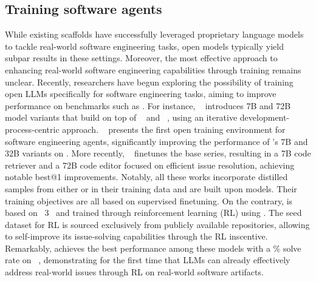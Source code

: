 \subsection{Training software agents}
While existing scaffolds have successfully leveraged proprietary language models to tackle real-world software engineering tasks, open models typically yield subpar results in these settings.
Moreover, the most effective approach to enhancing real-world software engineering capabilities through training remains unclear.
Recently, researchers have begun exploring the possibility of training open LLMs specifically for software engineering tasks, aiming to improve performance on benchmarks such as \swebench.
For instance, \swegpt~\cite{swegpt} introduces 7B and 72B model variants that build on top of ~\cite{qwen25coder} and ~\cite{qwen25}, using an iterative development-process-centric approach.
\swegym~\cite{swegym} presents the first open training environment for software engineering agents, significantly improving the performance of 's 7B and 32B variants on \swebench.
More recently, \swefixer~\cite{swefixer} finetunes the  base series, resulting in a 7B code retriever and a 72B code editor focused on efficient issue resolution, achieving notable best@1 improvements.
Notably, all these works incorporate distilled samples from either  or \sonnet{} in their training data and are built upon  models.
Their training objectives are all based on supervised finetuning.
On the contrary, \ours is based on \llama~3~\cite{llama31} and trained through reinforcement learning (RL) using \tech.
The seed dataset for RL is sourced exclusively from publicly available repositories,
allowing \ours to self-improve its issue-solving capabilities through the RL inscentive.
Remarkably, \ours achieves the best performance among these models with a \swebfinalbig{}\% solve rate on \swebverified~\cite{swebverified}, demonstrating for the first time that LLMs can already effectively address real-world issues through RL on real-world software artifacts.


